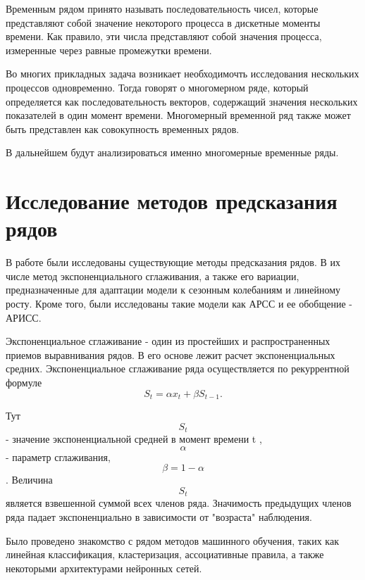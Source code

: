 \documentclass{article}
\begin{document}
\par{
Временным рядом принято называть последовательность чисел, которые представляют собой значение некоторого процесса в дискетные моменты времени. Как правило, эти числа представляют собой значения процесса, измеренные через равные промежутки времени. 
}

\par{
Во многих прикладных задача возникает необходимочть исследования нескольких процессов одновременно. Тогда говорят о многомерном ряде, который определяется как последовательность векторов, содержащий значения нескольких показателей в один момент времени. Многомерный временной ряд также может быть представлен как совокупность временных рядов. 
}

\par{
В дальнейшем будут анализироваться именно многомерные временные ряды. 
}

\newpage

\section{Исследование методов предсказания рядов}
\par{
В работе были исследованы существующие методы предсказания рядов. В их числе метод экспоненциального сглаживания, а также его вариации, предназначенные для адаптации модели к сезонным колебаниям и линейному росту. Кроме того, были исследованы такие модели как АРСС и ее обобщение - АРИСС. \cite{lukashin2003} 
}

\par{
Экспоненциальное сглаживание - один из простейших и распространенных приемов выравнивания рядов. В его основе лежит расчет экспоненциальных средних. Экспоненциальное сглаживание ряда осуществляется по рекуррентной формуле
}
\begin{equation}
S_t = \alpha x_t + \beta S_{t-1}.
\end{equation}

\par{
Тут $$S_t$$ -  значение экспоненциальной средней в момент времени t , $$\alpha$$ - параметр сглаживания, $$\beta = 1 - \alpha$$. Величина $$S_t$$ является взвешенной суммой всех членов ряда. Значимость предыдущих членов ряда падает экспоненциально в зависимости от "возраста" наблюдения. \cite{lukashin2003} 
}

\par{
Было проведено знакомство с рядом методов машинного обучения, таких как линейная классификация, кластеризация, ассоциативные правила, а также некоторыми архитектурами нейронных сетей.
}
\end{document}

